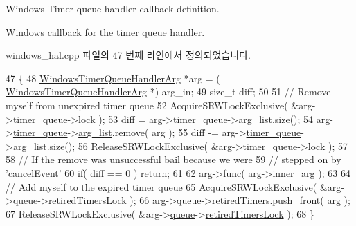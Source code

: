 Windows Timer queue handler callback definition. 

Windows callback for the timer queue handler. 

windows\+\_\+hal.\+cpp 파일의 47 번째 라인에서 정의되었습니다.


\begin{DoxyCode}
47                                                                        \{
48     \hyperlink{struct_windows_timer_queue_handler_arg}{WindowsTimerQueueHandlerArg} *arg = (
      \hyperlink{struct_windows_timer_queue_handler_arg}{WindowsTimerQueueHandlerArg} *) arg\_in;
49     \textcolor{keywordtype}{size\_t} diff;
50 
51     \textcolor{comment}{// Remove myself from unexpired timer queue}
52     AcquireSRWLockExclusive( &arg->\hyperlink{struct_windows_timer_queue_handler_arg_ae010a6908adeba19377ec504fe70f9cb}{timer\_queue}->\hyperlink{struct_timer_queue__t_afed18a2dbad108768defb51810a7a760}{lock} );
53     diff  = arg->\hyperlink{struct_windows_timer_queue_handler_arg_ae010a6908adeba19377ec504fe70f9cb}{timer\_queue}->\hyperlink{struct_timer_queue__t_abdc40944ec73781857b64230be2052df}{arg\_list}.size();
54     arg->\hyperlink{struct_windows_timer_queue_handler_arg_ae010a6908adeba19377ec504fe70f9cb}{timer\_queue}->\hyperlink{struct_timer_queue__t_abdc40944ec73781857b64230be2052df}{arg\_list}.remove( arg );
55     diff -= arg->\hyperlink{struct_windows_timer_queue_handler_arg_ae010a6908adeba19377ec504fe70f9cb}{timer\_queue}->\hyperlink{struct_timer_queue__t_abdc40944ec73781857b64230be2052df}{arg\_list}.size();
56     ReleaseSRWLockExclusive( &arg->\hyperlink{struct_windows_timer_queue_handler_arg_ae010a6908adeba19377ec504fe70f9cb}{timer\_queue}->\hyperlink{struct_timer_queue__t_afed18a2dbad108768defb51810a7a760}{lock} );
57 
58     \textcolor{comment}{// If the remove was unsuccessful bail because we were}
59     \textcolor{comment}{// stepped on by 'cancelEvent'}
60     \textcolor{keywordflow}{if}( diff == 0 ) \textcolor{keywordflow}{return};
61 
62     arg->\hyperlink{struct_windows_timer_queue_handler_arg_aaa1ebdc5351c8e4b6cd0b92aabfa4d52}{func}( arg->\hyperlink{struct_windows_timer_queue_handler_arg_afc701b8a5b43cd1d29422c68856bc614}{inner\_arg} );
63 
64     \textcolor{comment}{// Add myself to the expired timer queue}
65     AcquireSRWLockExclusive( &arg->\hyperlink{struct_windows_timer_queue_handler_arg_a3aa628a0d9ac623a379f3bcaf5f937c3}{queue}->\hyperlink{class_windows_timer_queue_a756b0f925bf4252e4b3782fb2eb179f4}{retiredTimersLock} );
66     arg->\hyperlink{struct_windows_timer_queue_handler_arg_a3aa628a0d9ac623a379f3bcaf5f937c3}{queue}->\hyperlink{class_windows_timer_queue_a1d247e5dc6ff5761a49ce7376ae9277d}{retiredTimers}.push\_front( arg );
67     ReleaseSRWLockExclusive( &arg->\hyperlink{struct_windows_timer_queue_handler_arg_a3aa628a0d9ac623a379f3bcaf5f937c3}{queue}->\hyperlink{class_windows_timer_queue_a756b0f925bf4252e4b3782fb2eb179f4}{retiredTimersLock} );
68 \}
\end{DoxyCode}


